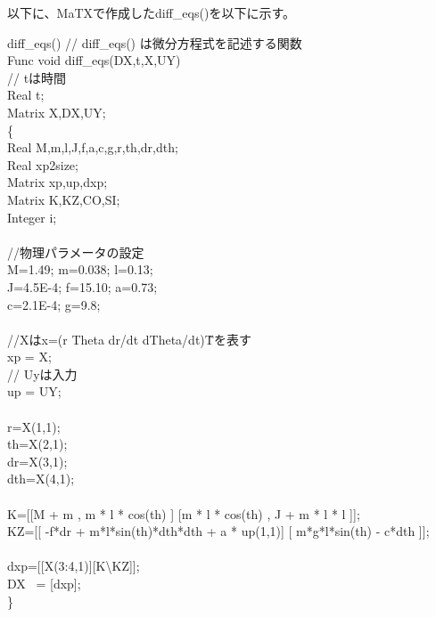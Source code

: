 \documentclass{jarticle}
\begin{document}
\begin{enumerate}
\begin{enumerate}
\begin{enumerate}
	 		   		以下に、MaTXで作成したdiff\_eqs()を以下に示す。\\
	 		   		\begin{itembox}[l]{diff\_eqs()}
	 		   			// diff\_eqs() は微分方程式を記述する関数\\
						Func void diff\_eqs(DX,t,X,UY)\\
						// tは時間\\
						Real t;\\
						Matrix X,DX,UY;\\
						\{\\
							Real M,m,l,J,f,a,c,g,r,th,dr,dth;\\
							Real xp2size;\\
							Matrix xp,up,dxp;\\
							Matrix K,KZ,CO,SI;\\
							Integer i;\\
							\\
							//物理パラメータの設定\\
							M=1.49;        m=0.038; l=0.13;\\
							J=4.5E-4; f=15.10; a=0.73;\\
							c=2.1E-4; g=9.8;\\
							\\
							//Xはx=(r Theta dr/dt dTheta/dt)\^Tを表す\\
							xp = X;\\
							// Uyは入力\\
							up = UY;\\
							\\
							r=X(1,1);\\
							th=X(2,1);\\
							dr=X(3,1);\\
							dth=X(4,1);\\
							\\
							K=[[M + m           , m * l * cos(th)  ]
							     [m * l * cos(th) , J + m * l * l    ]];
							\\
							KZ=[[    -f*dr      + m*l*sin(th)*dth*dth + a * up(1,1)]
								[ m*g*l*sin(th) - c*dth            ]];\\
							\\
							dxp=[[X(3:4,1)][K\textbackslash KZ]];\\
							DX \ = [dxp];\\
						\}\\
					\end{itembox}
					\\
	 		   	

\end{enumerate}
\end{enumerate}
\end{enumerate}
\end{document}
